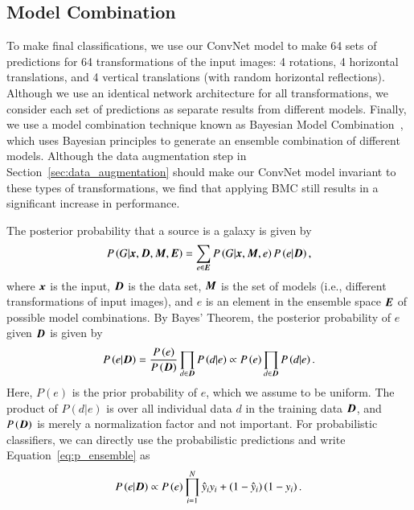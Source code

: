 \documentclass[fleqn,usenatbib]{mnras}
\newcommand{\ie}{{i.e., }}
\begin{document}
\subsection{Model Combination}
  \label{sec:bmc}

To make final classifications,
we use our ConvNet model to make 64 sets of predictions for
64 transformations of the input images:
4 rotations, 4 horizontal translations, and 4 vertical translations
(with random horizontal reflections).
Although we use an identical network architecture for all transformations,
we consider each set of predictions as separate results from different models.
Finally, we use a model combination technique known as
Bayesian Model Combination~\citep[BMC;][]{Monteith2011}, which
uses Bayesian principles to generate an ensemble combination of different models.
Although the data augmentation step in Section~\ref{sec:data_augmentation} should
make our ConvNet model invariant to these types of transformations,
we find that applying BMC still results in a significant increase in performance.

The posterior probability that a source is a galaxy is given by
\begin{equation} \label{eq:posterior_bmc}
  P \left(G | \bmath{x}, \bmath{D}, \bmath{M}, \bmath{E} \right)
  = \sum_{e \in \bmath{E}} P \left(G | \bmath{x}, \bmath{M}, e \right)
  P \left(e | \bmath{D} \right),
\end{equation}
where $\bmath{x}$ is the input, $\bmath{D}$ is the data set,
$\bmath{M}$ is the set of models (\ie different transformations of input images),
and $e$ is an element in the ensemble space $\bmath{E}$ of possible model combinations.
By Bayes' Theorem, the posterior probability of $e$ given $\bmath{D}$ is given by
\begin{equation} \label{eq:p_ensemble}
  P \left(e | \bmath{D} \right)
  = \frac{P \left(e \right)}{P \left(\bmath{D} \right)}
  \prod_{d \in \bmath{D}} P \left( d | e \right)
  \propto P \left(e\right) \prod_{d \in \bmath{D}} P \left(d | e \right).
\end{equation}
Here, $P\left(e \right)$ is the prior probability of $e$,
which we assume to be uniform.
The product of $P\left(d | e\right)$ is
over all individual data $d$ in the training data $\bmath{D}$,
and $P\left(\bmath{D}\right)$ is merely a normalization factor
and not important.
For probabilistic classifiers,
we can directly use the probabilistic predictions
and write Equation~\ref{eq:p_ensemble} as
\begin{equation} \label{eq:p_ensemble_prob}
  P \left( e | \bmath{D} \right) \propto 
  P \left( e \right) \prod_{i=1}^{N}
  \hat{y}_i y_i + 
  \left(1 - \hat{y}_i\right) \left(1 - y_i\right).
\end{equation}
\end{document}
